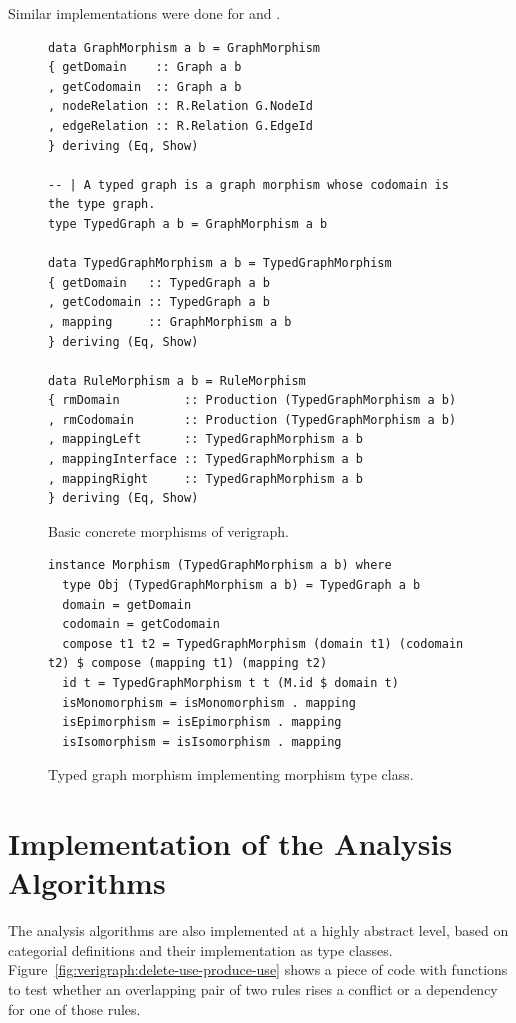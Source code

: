 Similar implementations were done for  and .

\begin{figure}[!ht]
\caption{Basic concrete morphisms of verigraph.}
\begin{verbatim}
data GraphMorphism a b = GraphMorphism 
{ getDomain    :: Graph a b
, getCodomain  :: Graph a b
, nodeRelation :: R.Relation G.NodeId
, edgeRelation :: R.Relation G.EdgeId
} deriving (Eq, Show)

-- | A typed graph is a graph morphism whose codomain is the type graph.
type TypedGraph a b = GraphMorphism a b

data TypedGraphMorphism a b = TypedGraphMorphism 
{ getDomain   :: TypedGraph a b
, getCodomain :: TypedGraph a b
, mapping     :: GraphMorphism a b
} deriving (Eq, Show)

data RuleMorphism a b = RuleMorphism 
{ rmDomain         :: Production (TypedGraphMorphism a b)
, rmCodomain       :: Production (TypedGraphMorphism a b)
, mappingLeft      :: TypedGraphMorphism a b
, mappingInterface :: TypedGraphMorphism a b
, mappingRight     :: TypedGraphMorphism a b
} deriving (Eq, Show)
\end{verbatim}
\label{fig:verigraph:concrete-morphisms}
\end{figure}

\begin{figure}[!ht]
\caption{Typed graph morphism implementing morphism type class.}
\begin{verbatim}
instance Morphism (TypedGraphMorphism a b) where
  type Obj (TypedGraphMorphism a b) = TypedGraph a b
  domain = getDomain
  codomain = getCodomain
  compose t1 t2 = TypedGraphMorphism (domain t1) (codomain t2) $ compose (mapping t1) (mapping t2)
  id t = TypedGraphMorphism t t (M.id $ domain t)
  isMonomorphism = isMonomorphism . mapping
  isEpimorphism = isEpimorphism . mapping
  isIsomorphism = isIsomorphism . mapping

\end{verbatim}
\label{fig:verigraph:morphism-implementation}
\end{figure}

\section{Implementation of the Analysis Algorithms}

The analysis algorithms are also implemented at a highly abstract level, based on categorial definitions and their implementation as type classes. Figure~\ref{fig:verigraph:delete-use-produce-use} shows a piece of code with functions to test whether an overlapping pair of two rules rises a conflict or a dependency for one of those rules. 

